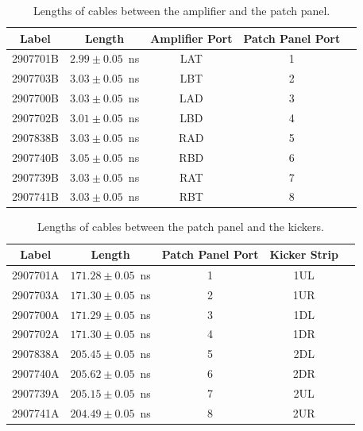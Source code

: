 \begin{table}
  \begin{center}
    \begin{tabular}{| c | c | c | c | c |}
	   \hline
       Label & Length & Amplifier Port & Patch Panel Port \\ \hline
       2907701B & \(2.99\pm0.05\)~ns & LAT & 1 \\
       2907703B & \(3.03\pm0.05\)~ns & LBT & 2 \\
       2907700B & \(3.03\pm0.05\)~ns & LAD & 3 \\
       2907702B & \(3.01\pm0.05\)~ns & LBD & 4 \\
       2907838B & \(3.03\pm0.05\)~ns & RAD & 5 \\
       2907740B & \(3.05\pm0.05\)~ns & RBD & 6 \\
       2907739B & \(3.03\pm0.05\)~ns & RAT & 7 \\
       2907741B & \(3.03\pm0.05\)~ns & RBT & 8 \\
 	   \hline
    \end{tabular}
    \caption{Lengths of cables between the amplifier and the patch panel.}
  	\label{t:shortCabLengths}
  \end{center}
\end{table}

\begin{table}
  \begin{center}
    \begin{tabular}{| c | c | c | c | c |}
	   \hline
       Label & Length & Patch Panel Port & Kicker Strip \\ \hline
       2907701A & \(171.28\pm0.05\)~ns & 1 & 1UL \\
       2907703A & \(171.30\pm0.05\)~ns & 2 & 1UR \\
       2907700A & \(171.29\pm0.05\)~ns & 3 & 1DL \\
       2907702A & \(171.30\pm0.05\)~ns & 4 & 1DR \\
       2907838A & \(205.45\pm0.05\)~ns & 5 & 2DL \\
       2907740A & \(205.62\pm0.05\)~ns & 6 & 2DR \\
       2907739A & \(205.15\pm0.05\)~ns & 7 & 2UL \\
       2907741A & \(204.49\pm0.05\)~ns & 8 & 2UR \\
 	   \hline
    \end{tabular}
    \caption{Lengths of cables between the patch panel and the kickers.}
  	\label{t:kickCabLengths}
  \end{center}
\end{table}

